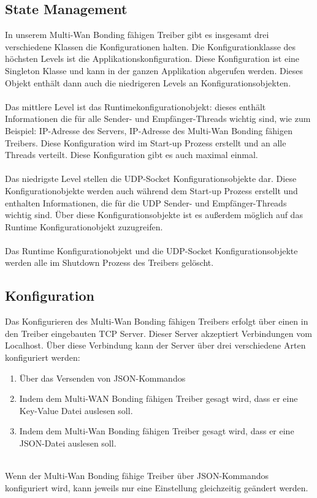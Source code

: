 \subsection{State Management}
In unserem Multi-Wan Bonding fähigen Treiber gibt es insgesamt drei verschiedene Klassen die Konfigurationen halten. Die Konfigurationklasse des höchsten Levels ist die Applikationskonfiguration. Diese Konfiguration ist eine Singleton Klasse und kann in der ganzen Applikation abgerufen werden. Dieses Objekt enthält dann auch die niedrigeren Levels an Konfigurationsobjekten.
\\\\
Das mittlere Level ist das Runtimekonfigurationobjekt: dieses enthält Informationen die für alle Sender- und Empfänger-Threads wichtig sind, wie zum Beispiel: IP-Adresse des Servers, IP-Adresse des Multi-Wan Bonding fähigen Treibers. Diese Konfiguration wird im Start-up Prozess erstellt und an alle Threads verteilt. Diese Konfiguration gibt es auch maximal einmal.
\\\\
Das niedrigste Level stellen die UDP-Socket Konfigurationsobjekte dar. Diese Konfigurationobjekte werden auch während dem Start-up Prozess erstellt und enthalten Informationen, die für die UDP Sender- und Empfänger-Threads wichtig sind. Über diese Konfigurationsobjekte ist es außerdem möglich auf das Runtime Konfigurationobjekt zuzugreifen. 
\\\\
Das Runtime Konfigurationobjekt und die UDP-Socket Konfigurationsobjekte werden alle im Shutdown Prozess des Treibers gelöscht.
\subsection{Konfiguration}
Das Konfigurieren des Multi-Wan Bonding fähigen Treibers erfolgt über einen in den Treiber eingebauten TCP Server. Dieser Server akzeptiert Verbindungen vom Localhost. Über diese Verbindung kann der Server über drei verschiedene Arten konfiguriert werden:
\\
\begin{enumerate}
    \item Über das Versenden von JSON-Kommandos
    \item Indem dem Multi-WAN Bonding fähigen Treiber gesagt wird, dass er eine Key-Value Datei auslesen soll.
    \item Indem dem Multi-Wan Bonding fähigen Treiber gesagt wird, dass er eine JSON-Datei auslesen soll.
\end{enumerate}
\ \\
Wenn der Multi-Wan Bonding fähige Treiber über JSON-Kommandos konfiguriert wird, kann jeweils nur eine Einstellung gleichzeitig geändert werden.

